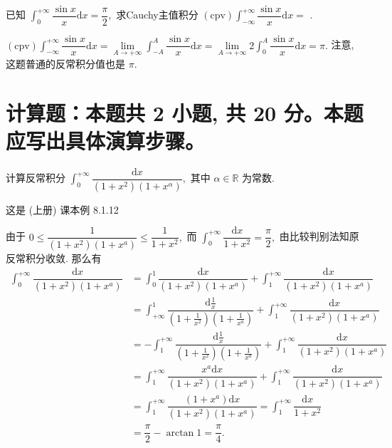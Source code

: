 \begin{question}
  已知 $\int_0^{+\infty} \dfrac{\sin x}{x} \mathrm{d} x = \dfrac{\pi}{2},$ 求Cauchy主值积分 $(\text{cpv}) \int_{-\infty}^{+\infty} \dfrac{\sin x}{x} \mathrm{d} x = $ \fillin[$\pi$].
\end{question}

\begin{solution}
  $(\text{cpv}) \int_{-\infty}^{+\infty} \dfrac{\sin x}{x} \mathrm{d} x = \lim\limits_{A\to+\infty} \int_{-A}^{A} \dfrac{\sin x}{x} \mathrm{d} x = \lim\limits_{A\to+\infty} 2 \int_{0}^{A} \dfrac{\sin x}{x} \mathrm{d} x = \pi.$ 注意, 这题普通的反常积分值也是 $\pi.$
\end{solution}


\section{计算题：本题共 2 小题, 共 20 分。本题应写出具体演算步骤。}


\begin{question}[points = 10]
  计算反常积分 $\int_0^{+\infty} \dfrac{\mathrm{d} x}{(1+x^2)(1+x^{\alpha})},$ 其中 $\alpha \in \mathbb{R}$ 为常数.

\end{question}

\begin{solution}
  这是 (上册) 课本例 8.1.12

  由于 $0 \leqslant \dfrac{1}{(1 + x^2)(1 + x^a)} \leqslant \dfrac{1}{1 + x^2},$ 而 $\int_0^{+\infty} \dfrac{\mathrm{d} x}{1 + x^2} = \dfrac{\pi}{2},$ 由比较判别法知原反常积分收敛. 那么有
  \begin{align*}
    \int_0^{+\infty} \dfrac{\mathrm{d} x}{(1 + x^2)(1 + x^a)} & = \int_0^1 \dfrac{\mathrm{d} x}{(1 + x^2)(1 + x^a)} + \int_1^{+\infty} \dfrac{\mathrm{d} x}{(1 + x^2)(1 + x^a)} \\
    & = \int_{+\infty}^1 \dfrac{\mathrm{d} \frac{1}{x}}{(1 + \frac{1}{x^2})(1 + \frac{1}{x^a})} + \int_1^{+\infty} \dfrac{\mathrm{d} x}{(1 + x^2)(1 + x^a)} \\
    & = -\int_1^{+\infty} \dfrac{\mathrm{d} \frac{1}{x}}{(1 + \frac{1}{x^2})(1 + \frac{1}{x^a})} + \int_1^{+\infty} \dfrac{\mathrm{d} x}{(1 + x^2)(1 + x^a)} \\
    & = \int_1^{+\infty} \dfrac{x^a \mathrm{d} x}{(1 + x^2)(1 + x^a)} + \int_1^{+\infty} \dfrac{\mathrm{d} x}{(1 + x^2)(1 + x^a)} \\
    & = \int_1^{+\infty} \dfrac{(1 + x^a) \mathrm{d} x}{(1 + x^2)(1 + x^a)} = \int_1^{+\infty} \dfrac{\mathrm{d} x}{1 + x^2} \\
    & = \dfrac{\pi}{2} - \arctan 1 = \dfrac{\pi}{4}.
  \end{align*}
\end{solution}

